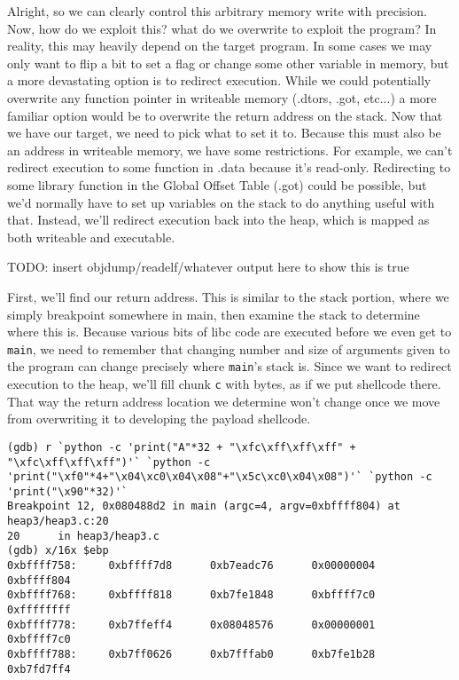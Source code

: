 Alright, so we can clearly control this arbitrary memory write with precision. Now,
how do we exploit this? what do we overwrite to exploit the program? In reality,
this may heavily depend on the target program. In some cases we may only want
to flip a bit to set a flag or change some other variable in memory, but
a more devastating option is to redirect execution. While we could
potentially overwrite any function pointer in writeable memory (.dtors, .got, etc...)
a more familiar option would be to overwrite the return address on the stack.
Now that we have our target, we need to pick what to set it to.
Because this must also be an address in writeable memory, we have some restrictions.
For example, we can't redirect execution to some function in .data because it's
read-only. Redirecting to some library function in the Global Offset Table (.got)
could be possible, but we'd normally have to set up variables on the stack
to do anything useful with that. Instead, we'll redirect execution back
into the heap, which is mapped as both writeable and executable.

TODO: insert objdump/readelf/whatever output here to show this is true

First, we'll find our return address. This is similar to the stack portion, where
we simply breakpoint somewhere in main, then examine the stack to determine where
this is. Because various bits of libc code are executed before we even get to
\texttt{main}, we need to remember that changing number and size of arguments
given to the program can change precisely where \texttt{main}'s stack is. Since we
want to redirect execution to the heap, we'll fill chunk \texttt{c} with bytes,
as if we put shellcode there. That way the return address location we determine 
won't change once we move from overwriting it to developing the payload shellcode.

\begin{lstlisting}
(gdb) r `python -c 'print("A"*32 + "\xfc\xff\xff\xff" + "\xfc\xff\xff\xff")'` `python -c 'print("\xf0"*4+"\x04\xc0\x04\x08"+"\x5c\xc0\x04\x08")'` `python -c 'print("\x90"*32)'`
Breakpoint 12, 0x080488d2 in main (argc=4, argv=0xbffff804) at heap3/heap3.c:20
20      in heap3/heap3.c
(gdb) x/16x $ebp
0xbffff758:     0xbffff7d8      0xb7eadc76      0x00000004      0xbffff804
0xbffff768:     0xbffff818      0xb7fe1848      0xbffff7c0      0xffffffff
0xbffff778:     0xb7ffeff4      0x08048576      0x00000001      0xbffff7c0
0xbffff788:     0xb7ff0626      0xb7fffab0      0xb7fe1b28      0xb7fd7ff4
\end{lstlisting}

